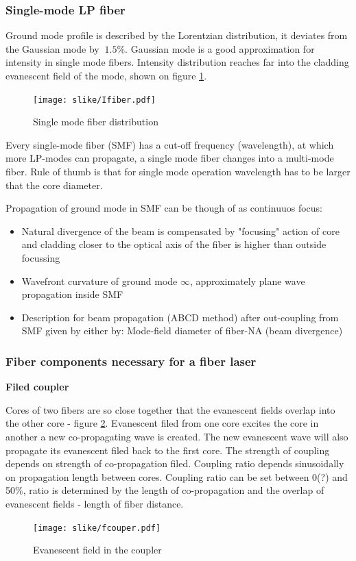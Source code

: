 \subsubsection{Single-mode LP fiber}
Ground mode profile is described by the Lorentzian distribution, it deviates from the Gaussian mode by $~1.5\%$. 
Gaussian mode is a good approximation for intensity in single mode fibers.  
Intensity distribution reaches far into the cladding \pd evanescent field of the mode, shown on figure \ref{fig:idfiber}.

\begin{figure}[h!]
    \centering
    \texttt{[image: slike/Ifiber.pdf]}
    \caption{Single mode fiber distribution}
    \label{fig:idfiber}
\end{figure}

Every single-mode fiber (SMF) has a cut-off frequency (wavelength), at which more LP-modes can propagate, a single mode 
fiber changes into a multi-mode fiber. Rule of thumb is that for single mode operation wavelength has to be larger that the core diameter.

Propagation of ground mode in SMF can be though of  as continuuos focus:
\begin{itemize}
    \item Natural divergence of the beam is compensated by "focusing" action of core and cladding \pd closer to the optical axis of the fiber is 
    higher than outside \pd focussing
    \item Wavefront curvature of ground mode \pd $\infty$, approximately plane wave propagation inside SMF
    \item Description for beam propagation (ABCD method) after out-coupling from SMF given by either by: Mode-field diameter of fiber-NA (beam divergence)
\end{itemize}

\subsubsection{Fiber components necessary for a fiber laser}
\textbf{Filed coupler}

Cores of two fibers are so close together that the evanescent fields overlap into the other core - figure \ref{fig:fcoupler}.  Evanescent filed from 
one core excites the core in another \pd a new co-propagating wave is created. The new evanescent wave will
also propagate its evanescent filed back to the first core.  
The strength of coupling depends on strength of co-propagation filed.
Coupling ratio depends sinusoidally on propagation length between cores. Coupling ratio can be set between 0(?) and 50\%, ratio is determined by
the length of co-propagation and the overlap of evanescent fields - length of fiber distance.
\begin{figure}[h!]
    \centering
    \texttt{[image: slike/fcouper.pdf]}
    \caption{Evanescent field in the coupler}
    \label{fig:fcoupler}
\end{figure}

